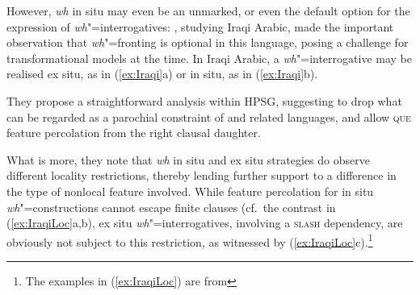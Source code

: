 \documentclass[output=paper
,notxmath 
	        ,collection
	        ,collectionchapter
 	        ,biblatex
                ,babelshorthands
                ,newtxmath
                ,draftmode
                ,colorlinks, citecolor=brown
]{langscibook}
\begin{document}
However, \emph{wh} in situ may even be an unmarked, or even the default
option for the expression of \emph{wh}"=interrogatives:
\citet[Section~6.2]{Johnson:Lappin:97}, studying Iraqi Arabic, made the important
observation that \emph{wh}"=fronting is optional in this language,
posing a challenge for transformational models at the time.  In Iraqi
Arabic, a \emph{wh}"=interrogative may be realised ex situ, as in
(\ref{ex:Iraqi}a) or in situ, as in (\ref{ex:Iraqi}b).

\eal
\label{ex:Iraqi}
\zl

\noindent
They propose a straightforward analysis within HPSG, suggesting to
drop what can be regarded as a parochial constraint of  and
related languages, and allow \textsc{que} feature percolation from the
right clausal daughter.
 
What is more, they note that \emph{wh} in situ and ex situ strategies
do observe different locality restrictions, thereby lending further
support to a difference in the type of nonlocal feature
involved. While feature percolation for in situ
\emph{wh}"=constructions cannot escape finite clauses (cf.\ the
contrast in (\ref{ex:IraqiLoc}a,b), ex situ \emph{wh}"=interrogatives,
involving a \textsc{slash} dependency, are obviously not subject to
this restriction, as witnessed by (\ref{ex:IraqiLoc}c).\footnote{The examples in (\ref{ex:IraqiLoc}) are from }


    
\eal \label{ex:IraqiLoc}
\zl
\end{document}
